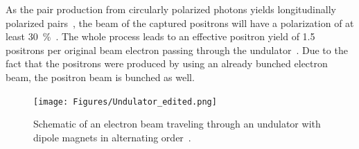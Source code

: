 As the pair production from circularly polarized photons yields longitudinally polarized \positron \electron pairs~\cite{Polarization}, the beam of the captured positrons will have a polarization of at least \SI{30}{\percent}~\cite[p. 14]{TDR32}.
The whole process leads to an effective positron yield of 1.5 positrons per original beam electron passing through the undulator~\cite{Ushakov}.
Due to the fact that the positrons were produced by using an already bunched electron beam, the positron beam is bunched as well. 
\begin{figure}
\centering
\texttt{[image: Figures/Undulator\_edited.png]}
\caption[Schematic layout of an undulator]{Schematic of an electron beam traveling through an undulator with dipole magnets in alternating order~\cite[based on p. 41]{Wille}.}
\label{fig:Undulator}
\end{figure}
